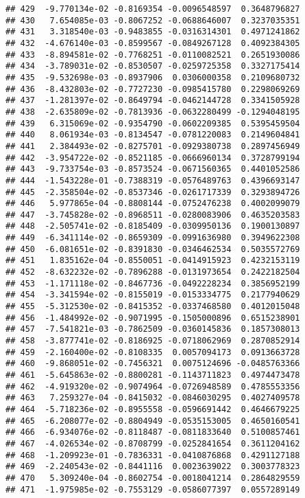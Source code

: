 \documentclass[
]{article}
\begin{document}
\begin{verbatim}
## 429  -9.770134e-02 -0.8169354 -0.0096548597  0.3648796827
## 430   7.654085e-03 -0.8067252 -0.0688646007  0.3237035351
## 431   3.318540e-03 -0.9483855 -0.0316314301  0.4971241862
## 432  -4.676140e-03 -0.8599567 -0.0849267128  0.4092384305
## 433  -8.894581e-02 -0.7768251 -0.0110082521  0.2651930086
## 434  -3.789031e-02 -0.8530507 -0.0259725358  0.3327175414
## 435  -9.532698e-03 -0.8937906  0.0306000358  0.2109680732
## 436  -8.432803e-02 -0.7727230 -0.0985415780  0.2298069269
## 437  -1.281397e-02 -0.8649794 -0.0462144728  0.3341505928
## 438  -2.635809e-02 -0.7813936 -0.0632280499 -0.1294048195
## 439   6.315069e-02 -0.9354790 -0.0602209385  0.5395459504
## 440   8.061934e-03 -0.8134547 -0.0781220083  0.2149604841
## 441   2.384493e-02 -0.8275701 -0.0929380738  0.2897456949
## 442  -3.954722e-02 -0.8521185 -0.0666960134  0.3728799194
## 443  -9.733754e-03 -0.8573524 -0.0671560365  0.4401052586
## 444  -1.543228e-01 -0.7388319 -0.0576489763  0.4396693147
## 445  -2.358504e-02 -0.8537346 -0.0261717339  0.3293894726
## 446   5.977865e-04 -0.8808144 -0.0752476238  0.4002099079
## 447  -3.745828e-02 -0.8968511 -0.0280083906  0.4635203583
## 448  -2.505741e-02 -0.8185409 -0.0309950136  0.1900130897
## 449  -6.341114e-02 -0.8659309 -0.0991636980  0.3949622308
## 450  -6.081651e-02 -0.8391830 -0.0346462534  0.5035572769
## 451   1.835162e-04 -0.8550051 -0.0414915923  0.4232153119
## 452  -8.632232e-02 -0.7896288 -0.0131973654  0.2422182504
## 453  -1.171118e-02 -0.8467736 -0.0492228234  0.3856952199
## 454  -3.341594e-02 -0.8155019 -0.0153334775  0.2177940629
## 455  -5.312530e-02 -0.8415352 -0.0337468580  0.4012015048
## 456  -1.484992e-02 -0.9071995 -0.1505000896  0.6515238901
## 457  -7.541821e-03 -0.7862509 -0.0360145836  0.1857308013
## 458  -3.877741e-02 -0.8186925 -0.0718062969  0.2870852914
## 459  -2.160400e-02 -0.8108335  0.0057094173  0.0913663728
## 460  -9.868051e-02 -0.7456321  0.0075124696 -0.0485763366
## 461  -5.645863e-02 -0.8800281 -0.1143711823  0.4974473478
## 462  -4.919320e-02 -0.9074964 -0.0726948589  0.4785553356
## 463   7.259327e-04 -0.8415032 -0.0846030295  0.4027409578
## 464  -5.718236e-02 -0.8955558 -0.0596691442  0.4646679225
## 465  -6.208077e-02 -0.8804949 -0.0535153005  0.4650160541
## 466  -6.934076e-02 -0.8118487 -0.0811833640  0.5100857461
## 467  -4.026534e-02 -0.8708799 -0.0252841654  0.3611204162
## 468  -1.209923e-01 -0.7836331 -0.0410876868  0.4291127188
## 469  -2.240543e-02 -0.8441116  0.0023639022  0.3003778323
## 470   5.309240e-04 -0.8602754 -0.0018041214  0.2864829559
## 471  -1.975985e-02 -0.7553129 -0.0586077397  0.0557289149

\end{verbatim}
\end{document}
